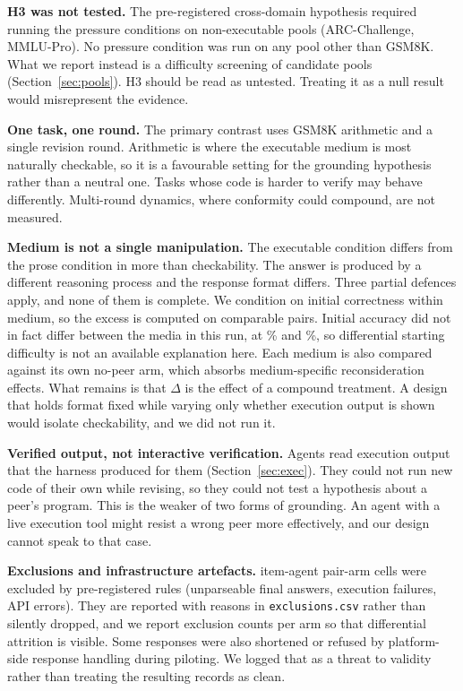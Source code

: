 \documentclass[conference]{IEEEtran}
\begin{document}
\textbf{H3 was not tested.} The pre-registered cross-domain hypothesis required
running the pressure conditions on non-executable pools (ARC-Challenge, MMLU-Pro). No
pressure condition was run on any pool other than GSM8K. What we report instead is a
difficulty screening of candidate pools (Section~\ref{sec:pools}). H3 should be read
as untested. Treating it as a null result would misrepresent the evidence.

\textbf{One task, one round.} The primary contrast uses GSM8K arithmetic and a single
revision round. Arithmetic is where the executable medium is most naturally
checkable, so it is a favourable setting for the grounding hypothesis rather than a
neutral one. Tasks whose code is harder to verify may behave differently. Multi-round
dynamics, where conformity could compound, are not measured.

\textbf{Medium is not a single manipulation.} The executable condition differs from
the prose condition in more than checkability. The answer is produced by a different
reasoning process and the response format differs. Three partial defences apply, and
none of them is complete. We condition on initial correctness within medium, so the
excess is computed on comparable pairs. Initial accuracy did not in fact differ
between the media in this run, at \PoolGSMNLPct\% and \PoolGSMCodePct\%, so
differential starting difficulty is not an available explanation here. Each medium is
also compared against its own no-peer arm, which absorbs medium-specific
reconsideration effects. What remains is that $\Delta$ is the effect of a compound
treatment. A design that holds format fixed while varying only whether execution
output is shown would isolate checkability, and we did not run it.

\textbf{Verified output, not interactive verification.} Agents read execution output
that the harness produced for them (Section~\ref{sec:exec}). They could not run new
code of their own while revising, so they could not test a hypothesis about a peer's
program. This is the weaker of two forms of grounding. An agent with a live
execution tool might resist a wrong peer more effectively, and our design cannot
speak to that case.

\textbf{Exclusions and infrastructure artefacts.} \NExcl{} item-agent pair-arm cells
were excluded by pre-registered rules (unparseable final answers, execution failures,
API errors). They are reported with reasons in \texttt{exclusions.csv} rather than
silently dropped, and we report exclusion counts per arm so that differential
attrition is visible. Some responses were also shortened or refused by platform-side
response handling during piloting. We logged that as a threat to validity rather than
treating the resulting records as clean.
\end{document}
